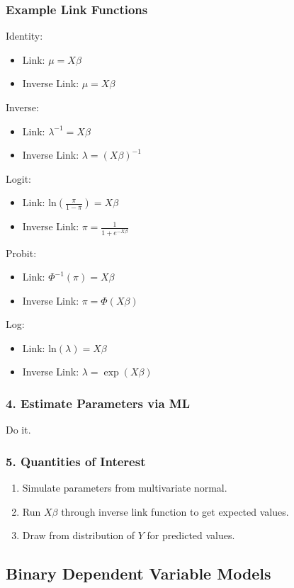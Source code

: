 \documentclass[handout]{beamer}
\begin{document}
\begin{frame}
\frametitle{Example Link Functions}
\pause
\footnotesize
Identity: 
\pause
\begin{itemize}
\item Link: $\mu = X\beta$ 
\pause
 \item Inverse Link: $\mu = X\beta$
\end{itemize}
\pause
Inverse:
\pause
\begin{itemize}
\item Link: $\lambda^{-1} = X\beta$
\pause 
\item Inverse Link:  $\lambda = (X\beta)^{-1}$
\end{itemize}
\pause
Logit: 
\pause
\begin{itemize}
\item Link: $\mathrm{ln} \left( \frac{\pi}{1-\pi} \right) = X\beta$
\pause 
\item Inverse Link: $\pi = \frac{1}{1 + e^{-X\beta}} $
\end{itemize}
\pause
Probit: 
\pause
\begin{itemize}
\item Link: $\Phi^{-1}(\pi) = X\beta$
\pause 
\item Inverse Link: $\pi = \Phi(X\beta) $
\end{itemize}
\pause
Log:
\pause
\begin{itemize}
\item Link: $\mathrm{ln}(\lambda) = X\beta$
\pause 
\item Inverse Link: $\lambda = \exp(X\beta) $
\end{itemize}
\end{frame}

\begin{frame}
\frametitle{4. Estimate Parameters via ML}
\pause
Do it.
\end{frame}

\begin{frame}
\frametitle{5. Quantities of Interest}
\pause
\begin{enumerate}
\item Simulate parameters from multivariate normal.
\pause
\item Run $X\beta$ through inverse link function to get expected values.
\pause
\item Draw from distribution of $Y$ for predicted values.
\end{enumerate}
\end{frame}

\subsection{Binary Dependent Variable Models}
\end{document}
